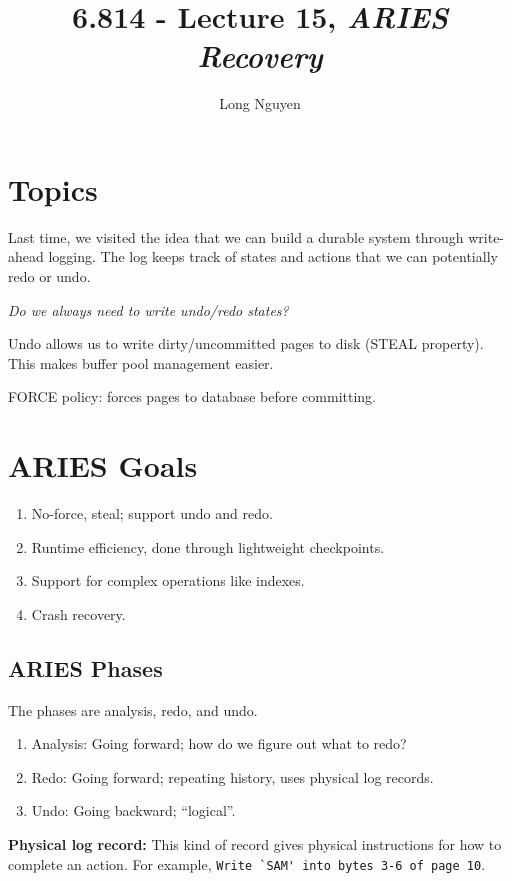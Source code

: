 \documentclass{article}
\title{6.814 - Lecture 15, \emph{ARIES Recovery}}
\author{Long Nguyen}
\begin{document}
\maketitle

\section{Topics}

Last time, we visited the idea that we can build a durable system through write-ahead logging. The log keeps track of states and actions that we can potentially redo or undo.

\emph{Do we always need to write undo/redo states?} 

Undo allows us to write dirty/uncommitted pages to disk (STEAL property). This makes buffer pool management easier.

FORCE policy: forces pages to database before committing.

\section{ARIES Goals}

\begin{enumerate}
    \item No-force, steal; support undo and redo.
    \item Runtime efficiency, done through lightweight checkpoints.
    \item Support for complex operations like indexes.
    \item Crash recovery.
\end{enumerate}

\subsection{ARIES Phases}

The phases are analysis, redo, and undo.

\begin{enumerate}
    \item Analysis: Going forward; how do we figure out what to redo?
    \item Redo: Going forward; repeating history, uses physical log records.
    \item Undo: Going backward; ``logical''.
\end{enumerate}

\textbf{Physical log record:} This kind of record gives physical instructions for how to complete an action. For example, \verb|Write `SAM' into bytes 3-6 of page 10|.
\end{document}

